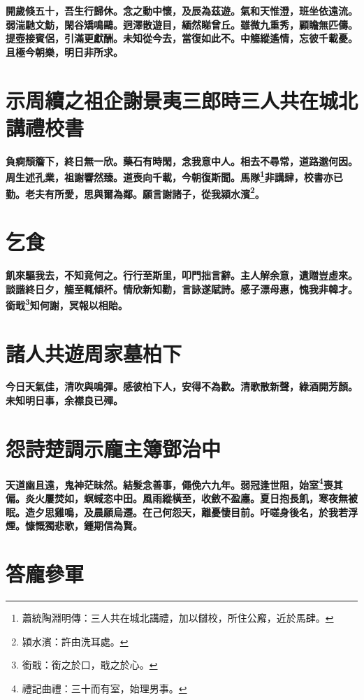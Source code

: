 \textbf{開歲倏五十，吾生行歸休。念之動中懷，及辰為茲遊。氣和天惟澄，班坐依遠流。弱湍馳文魴，閑谷矯鳴鷗。迥澤散遊目，緬然睇曾丘。雖微九重秀，顧瞻無匹儔。提壺接賓侶，引滿更獻酬。未知從今去，當復如此不。中觴縱遙情，忘彼千載憂。且極今朝樂，明日非所求。}

\section{示周續之祖企謝景夷三郎時三人共在城北講禮校書}

\textbf{負痾頹簷下，終日無一欣。藥石有時閑，念我意中人。相去不尋常，道路邈何因。周生述孔業，祖謝響然臻。道喪向千載，今朝復斯聞。馬隊\footnote{蕭統陶淵明傳：三人共在城北講禮，加以讎校，所住公廨，近於馬肆。}非講肆，校書亦已勤。老夫有所愛，思與爾為鄰。願言謝諸子，從我潁水濱\footnote{潁水濱：許由洗耳處。}。}

\section{乞食}

\textbf{飢來驅我去，不知竟何之。行行至斯里，叩門拙言辭。主人解余意，遺贈豈虛來。談諧終日夕，觴至輒傾杯。情欣新知勸，言詠遂賦詩。感子漂母惠，愧我非韓才。銜戢\footnote{銜戢：銜之於口，戢之於心。}知何謝，冥報以相貽。}

\section{諸人共遊周家墓柏下}

\textbf{今日天氣佳，清吹與鳴彈。感彼柏下人，安得不為歡。清歌散新聲，綠酒開芳顏。未知明日事，余襟良已殫。}

\section{怨詩楚調示龐主簿鄧治中}

\textbf{天道幽且遠，鬼神茫昧然。結髮念善事，僶俛六九年。弱冠逢世阻，始室\footnote{禮記曲禮：三十而有室，始理男事。}喪其偏。炎火屢焚如，螟蜮恣中田。風雨縱橫至，收斂不盈廛。夏日抱長飢，寒夜無被眠。造夕思雞鳴，及晨願烏遷。在己何怨天，離憂悽目前。吁嗟身後名，於我若浮煙。慷慨獨悲歌，鍾期信為賢。}

\section{答龐參軍\hspace{1ex}{\footnotesize 并序}}

